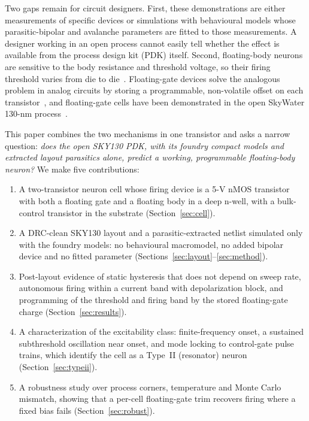 \documentclass[a4paper,fleqn]{cas-dc}
\begin{document}
Two gaps remain for circuit designers. First, these demonstrations are either measurements of specific devices or simulations with behavioural models whose parasitic-bipolar and avalanche parameters are fitted to those measurements. A designer working in an open process cannot easily tell whether the effect is available from the process design kit (PDK) itself. Second, floating-body neurons are sensitive to the body resistance and threshold voltage, so their firing threshold varies from die to die~\cite{pazos2025}. Floating-gate devices solve the analogous problem in analog circuits by storing a programmable, non-volatile offset on each transistor~\cite{diorio1996,bhattacharyya2025}, and floating-gate cells have been demonstrated in the open SkyWater 130-nm process~\cite{hasler2021woset,chen2024fg}.

This paper combines the two mechanisms in one transistor and asks a narrow question: \emph{does the open SKY130 PDK, with its foundry compact models and extracted layout parasitics alone, predict a working, programmable floating-body neuron?} We make five contributions:
\begin{enumerate}
\item A two-transistor neuron cell whose firing device is a 5-V nMOS transistor with both a floating gate and a floating body in a deep n-well, with a bulk-control transistor in the substrate (Section~\ref{sec:cell}).
\item A DRC-clean SKY130 layout and a parasitic-extracted netlist simulated only with the foundry models: no behavioural macromodel, no added bipolar device and no fitted parameter (Sections~\ref{sec:layout}--\ref{sec:method}).
\item Post-layout evidence of static hysteresis that does not depend on sweep rate, autonomous firing within a current band with depolarization block, and programming of the threshold and firing band by the stored floating-gate charge (Section~\ref{sec:results}).
\item A characterization of the excitability class: finite-frequency onset, a sustained subthreshold oscillation near onset, and mode locking to control-gate pulse trains, which identify the cell as a Type~II (resonator) neuron (Section~\ref{sec:typeii}).
\item A robustness study over process corners, temperature and Monte Carlo mismatch, showing that a per-cell floating-gate trim recovers firing where a fixed bias fails (Section~\ref{sec:robust}).
\end{enumerate}
\end{document}
